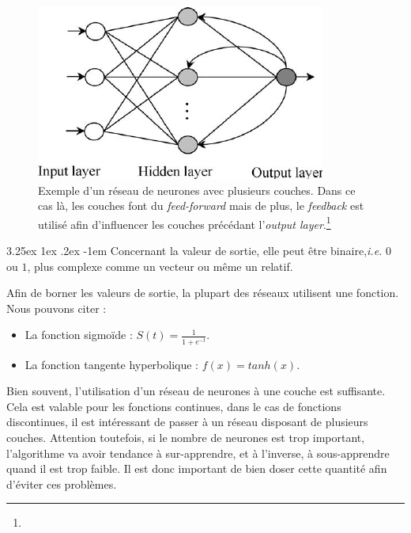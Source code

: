 \documentclass[a4paper, 11pt]{article}
\makeatletter
\renewcommand\paragraph{\@startsection{paragraph}{5}{\z@}%
  {3.25ex \@plus1ex \@minus.2ex}%
  {-1em}%
  {\normalfont\normalsize\bfseries}}
\makeatother
\begin{document}
\begin{figure}[H]
\centering
\includegraphics{images/neural_net_feedback}
\caption[]{Exemple d'un réseau de neurones avec plusieurs couches. Dans ce cas là,
les couches font du \textit{feed-forward} mais de plus, le \textit{feedback} est utilisé afin
d'influencer les couches précédant l'\textit{output layer}.\footnote[2]{}}
\end{figure}


\paragraph{}
Concernant la valeur de sortie, elle peut être binaire,\textit{i.e.} $0$ ou $1$, plus complexe comme un vecteur ou même un relatif.

Afin de borner les valeurs de sortie, la plupart des réseaux utilisent une fonction. Nous pouvons citer :
\begin{itemize}
\item La fonction sigmoïde : $S(t) = \frac{1}{1 + e^{-t}}$.
\item La fonction tangente hyperbolique : $f(x) = tanh(x)$.
\end{itemize}

Bien souvent, l'utilisation d'un réseau de neurones à une couche est suffisante. Cela est valable pour les fonctions continues,
dans le cas de fonctions discontinues, il est intéressant de passer à un réseau disposant de plusieurs couches.
Attention toutefois, si le nombre de neurones est trop important, l'algorithme va avoir tendance à sur-apprendre,
et à l'inverse, à sous-apprendre quand il est trop faible. Il est donc important de bien doser cette quantité afin
d'éviter ces problèmes.
\end{document}

